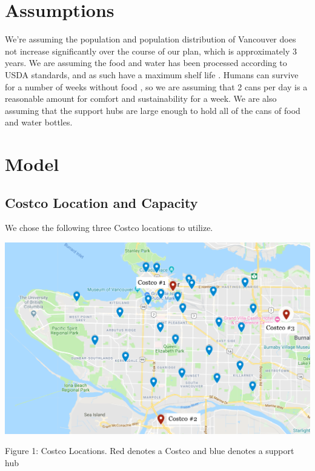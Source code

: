 \documentclass{article}
\begin{document}
\section{Assumptions}

We're assuming the population and population distribution of Vancouver does not increase significantly over the course of our plan, which is approximately 3 years.  We are assuming the food and water has been processed according to USDA standards, and as such have a maximum shelf life \cite{can life}. Humans can survive for a number of weeks without food \cite{21daysnofood}, so we are assuming that 2 cans per day is a reasonable amount for comfort and sustainability for a week. We are also assuming that the support hubs are large enough to hold all of the cans of food and water bottles. 

\section{Model}

\subsection{Costco Location and Capacity}

We chose the following three Costco locations to utilize.


\begin{center}
    \includegraphics[scale=.3]{costcos.png}
    
    \caption{Figure 1: Costco Locations. Red denotes a Costco and blue denotes a support hub}
\end{center}
\end{document}
